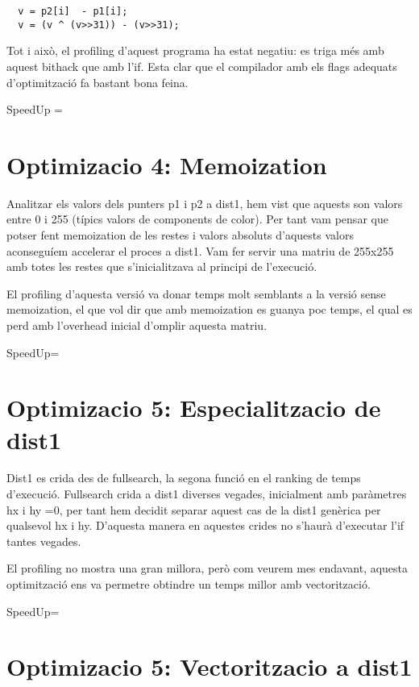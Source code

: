 \begin{lstlisting}
  v = p2[i]  - p1[i];
  v = (v ^ (v>>31)) - (v>>31);
\end{lstlisting}
 

Tot i això, el profiling d'aquest programa ha estat negatiu: es triga més amb aquest bithack que amb l'if. Esta clar que el compilador amb els flags adequats d'optimització fa bastant bona feina.
              
SpeedUp = 

\section{Optimizacio 4: Memoization}
Analitzar els valors dels punters p1 i p2 a dist1, hem vist que aquests son valors entre 0 i 255 (típics valors de components de color). Per tant vam pensar que potser fent memoization de les restes i valors absoluts d'aquests valors aconseguíem accelerar el proces a dist1. Vam fer servir una matriu de 255x255 amb totes les restes que s'inicialitzava al principi de l'execució. 

El profiling d'aquesta versió va donar temps molt semblants a la versió sense memoization, el que vol dir que amb memoization es guanya poc temps, el qual es perd amb l'overhead inicial d'omplir aquesta matriu.

SpeedUp=

\section{Optimizacio 5: Especialitzacio de dist1}
Dist1 es crida des de fullsearch, la segona funció en el ranking de temps d'execució. Fullsearch crida a dist1 diverses vegades, inicialment amb paràmetres hx i hy =0, per tant hem decidit separar aquest cas de la dist1 genèrica per qualsevol hx i hy. D'aquesta manera en aquestes crides no s'haurà d'executar l'if tantes vegades.

El profiling no mostra una gran millora, però com veurem mes endavant, aquesta optimització ens va permetre obtindre un temps millor amb vectorització.

SpeedUp=


\section{Optimizacio 5: Vectoritzacio a dist1}